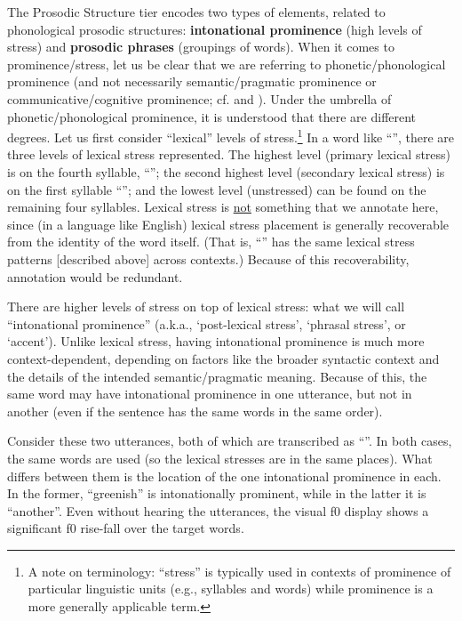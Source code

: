 The Prosodic Structure tier encodes two types of elements, related to phonological prosodic structures: \textbf{intonational prominence} (high levels of stress) and \textbf{prosodic phrases} (groupings of words). When it comes to prominence\slash stress, let us be clear that we are referring to phonetic\slash phonological prominence (and not necessarily semantic\slash pragmatic prominence or communicative\slash cognitive prominence; cf. \citealt{gussenhoven15} and \citealt{wagner-15}). Under the umbrella of phonetic\slash phonological prominence, it is understood that there are different degrees. Let us first consider “lexical” levels of stress.\footnote{A note on terminology: “stress” is typically used in contexts of prominence of particular linguistic units (e.g., syllables and words) while prominence is a more generally applicable term.} In a word like “”, there are three levels of lexical stress represented. The highest level (primary lexical stress) is on the fourth syllable, “”; the second highest level (secondary lexical stress) is on the first syllable “”; and the lowest level (unstressed) can be found on the remaining four syllables. Lexical stress is \uline{not} something that we annotate here, since (in a language like English) lexical stress placement is generally recoverable from the identity of the word itself. (That is, “” has the same lexical stress patterns [described above] across contexts.) Because of this recoverability, annotation would be redundant.

There are higher levels of stress on top of lexical stress: what we will call “intonational prominence” (a.k.a., ‘post-lexical stress’, ‘phrasal stress’, or ‘accent’). Unlike lexical stress, having intonational prominence is much more context-dependent, depending on factors like the broader syntactic context and the details of the intended semantic\slash pragmatic meaning. Because of this, the same word may have intonational prominence in one utterance, but not in another (even if the sentence has the same words in the same order).

Consider these two utterances, both of which are transcribed as “”. In both cases, the same words are used (so the lexical stresses are in the same places). What differs between them is the location of the one intonational prominence in each. In the former, “greenish” is intonationally prominent, while in the latter it is “another”. Even without hearing the utterances, the visual f0 display shows a significant f0 rise-fall over the target words. 

